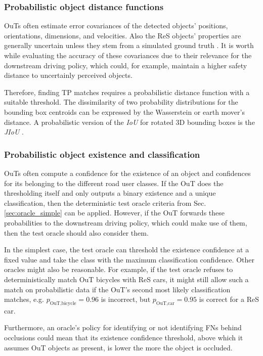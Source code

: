 \documentclass[conference]{IEEEtran}
\begin{document}
\subsubsection{Probabilistic object distance functions}
\label{sec:prob_bbox}
OuTs often estimate error covariances of the detected objects' positions, orientations, dimensions, and velocities. 
Also the ReS objects' properties are generally uncertain unless they stem from a simulated ground truth \cite{Wang2020inferring_iros}.
It is worth while evaluating the accuracy of these covariances due to their relevance for the downstream driving policy, which could, for example, maintain a higher safety distance to uncertainly perceived objects.

Therefore, finding TP matches requires a probabilistic distance function with a suitable threshold. 
The dissimilarity of two probability distributions for the bounding box centroids can be expressed by the Wasserstein or earth mover's distance.
A probabilistic version of the \textit{IoU} for rotated 3D bounding boxes is the \textit{JIoU} \cite{Wang2020inferring_iros}.

\subsubsection{Probabilistic object existence and classification}
\label{sec:prob_thresholding}

OuTs often compute a confidence for the existence of an object and confidences for its belonging to the different road user classes.
If the OuT does the thresholding itself and only outputs a binary existence and a unique classification, then the deterministic test oracle criteria from Sec. \ref{sec:oracle_simple} can be applied. 
However, if the OuT forwards these probabilities to the downstream driving policy, which could make use of them, then the test oracle should also consider them. 

In the simplest case, the test oracle can threshold the existence confidence at a fixed value and take the class with the maximum classification confidence.
Other oracles might also be reasonable.
For example, if the test oracle refuses to deterministically match OuT bicycles with ReS cars, it might still allow such a match on probabilistic data if the OuT's second most likely classification matches, e.g. $p_\text{OuT,bicycle} = 0.96$ is incorrect, but $p_\text{OuT,car} = 0.95$ is correct for a ReS car.

Furthermore, an oracle's policy for identifying or not identifying FNs behind occlusions could mean that its existence confidence threshold, above which it assumes OuT objects as present, is lower the more the object is occluded.
\end{document}
